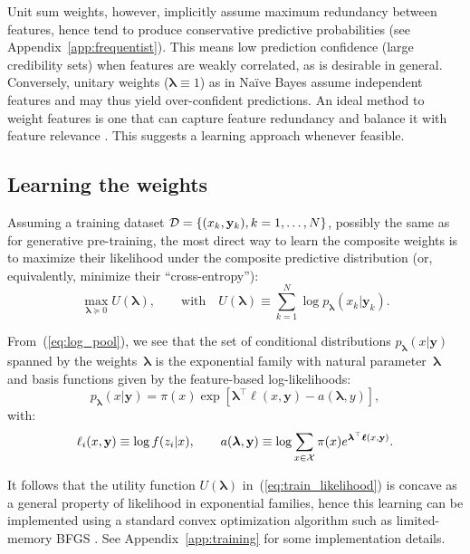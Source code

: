 \documentclass[english]{scrartcl}
\def\y{{\mathbf{y}}}
\newcommand{\blambda}{{\boldsymbol{\lambda}}}
\newcommand{\bell}{{\boldsymbol{\ell}}}
\begin{document}

Unit sum weights, however, implicitly assume maximum redundancy between features, hence tend to produce conservative predictive probabilities (see Appendix~\ref{app:frequentist}). This means low prediction confidence (large credibility sets) when features are weakly correlated, as is desirable in general. Conversely, unitary weights ($\blambda\equiv 1$) as in Na\"ive Bayes assume independent features and may thus yield over-confident predictions. An ideal method to weight features is one that can capture feature redundancy and balance it with feature relevance \cite{Peng-05}. This suggests a learning approach whenever feasible.



\subsection{Learning the weights}
\label{sec:learning}

Assuming a training dataset ${\cal D}=\{(x_k,\y_k), k=1,\ldots,N\}$, possibly the same as for generative pre-training, the most direct way to learn the composite weights is to maximize their likelihood under the composite predictive distribution (or, equivalently, minimize their ``cross-entropy''):
\begin{equation}
\label{eq:train_likelihood}
\max_{\blambda\succeq 0} U(\blambda),
\qquad \text{with} \quad
U(\blambda) \equiv\sum_{k=1}^N \log p_\blambda(x_k|\y_k).
\end{equation}

From~(\ref{eq:log_pool}), we see that the set of conditional distributions $p_\blambda(x|\y)$ spanned by the weights~$\blambda$ is the exponential family with natural parameter~$\blambda$ and basis functions given by the feature-based log-likelihoods:
$$
p_\blambda(x|\y) = \pi(x) \exp[\blambda^\top \bell(x,\y) - a(\blambda,y)],
$$
with:
$$
\ell_i(x,\y) \equiv \log f(z_i|x),
\qquad
a(\blambda, \y) \equiv \log \sum_{x\in{\cal X}} \pi(x) e^{\blambda^\top \bell(x,\y)}.
$$

It follows that the utility function $U(\blambda)$ in~(\ref{eq:train_likelihood}) is concave as a general property of likelihood in exponential families, hence this learning can be implemented using a standard convex optimization algorithm such as limited-memory BFGS \cite{Byrd-95}. See Appendix~\ref{app:training} for some implementation details. 
\end{document}
